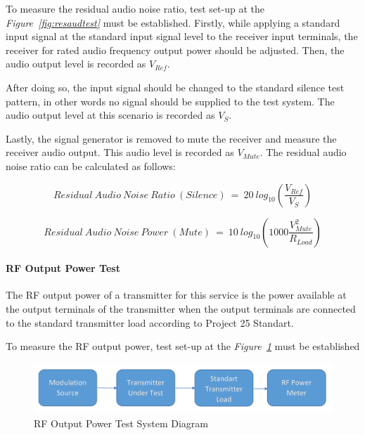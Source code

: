 	To measure the residual audio noise ratio, test set-up at the \textit{Figure~\ref{fig:resaudtest}} must be established. Firstly, while applying a standard input signal at the standard input signal level to the receiver input terminals, the receiver for rated audio frequency output power should be adjusted. Then, the audio output level is recorded as $V_{Ref}$.
	
	After doing so, the input signal should be changed to the standard silence test pattern, in other words no signal should be supplied to the test system. The audio output level at this scenario is recorded as $V_{S}$.
	
	Lastly, the signal generator is removed to mute the receiver and measure the receiver audio output. This audio level is recorded as $V_{Mute}$. The residual audio noise ratio can be calculated as follows:
	
$$	Residual~Audio~Noise~Ratio~(Silence)~=~20~log_{10}(\frac{V_{Ref}}{V_{S}}) 	$$

$$	Residual~Audio~Noise~Power~(Mute)~=~10~log_{10}(1000\frac{V^2_{Mute}}{R_{Load}}) 	$$



\paragraph{RF Output Power Test}
\- \indent
	The RF output power of a transmitter for this service is the power available at the output terminals of the transmitter when the output terminals are connected to the standard transmitter load according to Project 25 Standart\cite{P25}.

	To measure the RF output power, test set-up at the \textit{Figure~\ref{fig:rfouttest}} must be established
	
	
\begin{figure}[H]
	\center
	\setlength{\unitlength}{\textwidth} 
	\includegraphics[width=1.0\unitlength]{rfouttest}
	\caption{\label{fig:rfouttest}RF Output Power Test System Diagram }
\end{figure}



